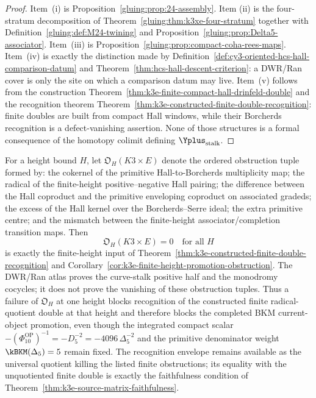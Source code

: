 \begin{proof}
Item~\textup{(i)} is Proposition~\ref{gluing:prop:24-assembly}. Item
\textup{(ii)} is the four-stratum decomposition of
Theorem~\ref{gluing:thm:k3xe-four-stratum} together with
Definition~\ref{gluing:def:M24-twining} and
Proposition~\ref{gluing:prop:Delta5-associator}. Item~\textup{(iii)}
is Proposition~\ref{gluing:prop:compact-coha-rees-maps}. Item~\textup{(iv)}
is exactly the distinction made by
Definition~\ref{def:cy3-oriented-hcs-hall-comparison-datum} and
Theorem~\ref{thm:hcs-hall-descent-criterion}: a DWR/Ran cover is only
the site on which a comparison datum may live. Item~\textup{(v)}
follows from the construction
Theorem~\ref{thm:k3e-finite-compact-hall-drinfeld-double} and the
recognition theorem
Theorem~\ref{thm:k3e-constructed-finite-double-recognition}: finite
doubles are built from compact Hall windows, while their Borcherds
recognition is a defect-vanishing assertion. None of those structures
is a formal consequence of the homotopy colimit defining
\(\Yplus_{\mathrm{stalk}}\).
\end{proof}

\begin{remark}
\label{gluing:rem:k3xe-finite-height-double-obstruction}
For a height bound \(H\), let
\(\mathfrak O_H(K3\times E)\) denote the ordered obstruction tuple
formed by: the cokernel of the primitive Hall-to-Borcherds multiplicity
map; the radical of the finite-height positive--negative Hall pairing;
the difference between the Hall coproduct and the primitive enveloping
coproduct on associated gradeds; the excess of the Hall kernel over the
Borcherds--Serre ideal; the extra primitive centre; and the mismatch
between the finite-height associator/completion transition maps. Then
\[
 \mathfrak O_H(K3\times E)=0\quad\text{for all }H
\]
is exactly the finite-height input of
Theorem~\ref{thm:k3e-constructed-finite-double-recognition} and
Corollary~\ref{cor:k3e-finite-height-promotion-obstruction}. The
DWR/Ran atlas proves the curve-stalk positive half and the monodromy
cocycles; it does not prove the vanishing of these obstruction tuples.
Thus a failure of \(\mathfrak O_H\) at one height blocks recognition of
the constructed finite radical-quotient double at that height and
therefore blocks the completed BKM current-object promotion, even
though the integrated compact scalar
\(-(\Phi_{10}^{\mathrm{OP}})^{-1}=-D_5^{-2}
=-4096\,\Delta_5^{-2}\) and the primitive denominator weight
\(\kBKM(\Delta_5)=5\) remain fixed.
The recognition envelope remains available as the universal quotient
killing the listed finite obstructions; its equality with the
unquotiented finite double is exactly the faithfulness condition of
Theorem~\ref{thm:k3e-source-matrix-faithfulness}.
\end{remark}

